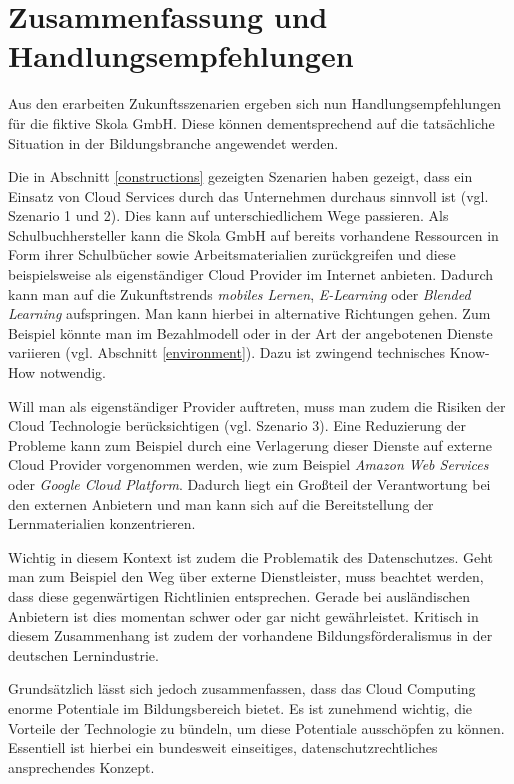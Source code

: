 \section{Zusammenfassung und Handlungsempfehlungen}
\label{conclusion}
Aus den erarbeiten Zukunftsszenarien ergeben sich nun Handlungsempfehlungen für die fiktive Skola GmbH. Diese können dementsprechend auf die tatsächliche Situation in der Bildungsbranche angewendet werden.

Die in Abschnitt \ref{constructions} gezeigten Szenarien haben gezeigt, dass ein Einsatz von Cloud Services durch das Unternehmen durchaus sinnvoll ist (vgl. Szenario 1 und 2). Dies kann auf unterschiedlichem Wege passieren. Als Schulbuchhersteller kann die Skola GmbH auf bereits vorhandene Ressourcen in Form ihrer Schulbücher sowie Arbeitsmaterialien zurückgreifen und diese beispielsweise als eigenständiger Cloud Provider im Internet anbieten. Dadurch kann man auf die Zukunftstrends \textit{mobiles Lernen}, \textit{E-Learning} oder \textit{Blended Learning} aufspringen. Man kann hierbei in alternative Richtungen gehen. Zum Beispiel könnte man im Bezahlmodell oder in der Art der angebotenen Dienste variieren (vgl. Abschnitt \ref{environment}). Dazu ist zwingend technisches Know-How notwendig. 

Will man als eigenständiger Provider auftreten, muss man zudem die Risiken der Cloud Technologie berücksichtigen (vgl. Szenario 3). Eine Reduzierung der Probleme kann zum Beispiel durch eine Verlagerung dieser Dienste auf externe Cloud Provider vorgenommen werden, wie zum Beispiel \textit{Amazon Web Services} oder \textit{Google Cloud Platform}. Dadurch liegt ein Großteil der Verantwortung bei den externen Anbietern und man kann sich auf die Bereitstellung der Lernmaterialien konzentrieren.

Wichtig in diesem Kontext ist zudem die Problematik des Datenschutzes. Geht man zum Beispiel den Weg über externe Dienstleister, muss beachtet werden, dass diese gegenwärtigen Richtlinien entsprechen. Gerade bei ausländischen Anbietern ist dies momentan schwer oder gar nicht gewährleistet. Kritisch in diesem Zusammenhang ist zudem der vorhandene Bildungsförderalismus in der deutschen Lernindustrie.

Grundsätzlich lässt sich jedoch zusammenfassen, dass das Cloud Computing enorme Potentiale im Bildungsbereich bietet. Es ist zunehmend wichtig, die Vorteile der Technologie zu bündeln, um diese Potentiale ausschöpfen zu können. Essentiell ist hierbei ein bundesweit einseitiges, datenschutzrechtliches ansprechendes Konzept.